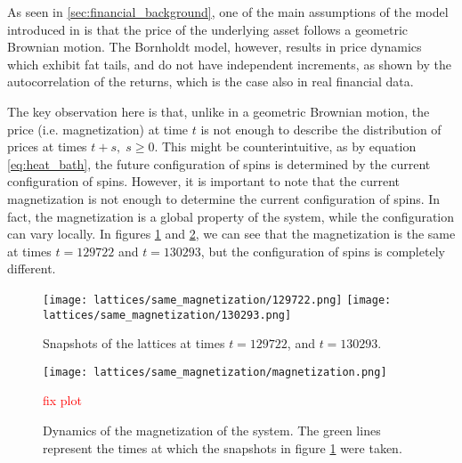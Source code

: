 As seen in \ref{sec:financial_background}, one of the main assumptions of the model introduced in \cite{black_scholes} is that the price of the underlying asset follows a geometric Brownian motion. The Bornholdt model, however, results in price dynamics which exhibit fat tails, and do not have independent increments, as shown by the autocorrelation of the returns, which is the case also in real financial data.

The key observation here is that, unlike in a geometric Brownian motion, the price (i.e. magnetization) at time $t$ is not enough to describe the distribution of prices at times $t+s, \; s\geq 0$. This might be counterintuitive, as by equation \ref{eq:heat_bath}, the future configuration of spins is determined by the current configuration of spins. However, it is important to note that the current magnetization is not enough to determine the current configuration of spins. In fact, the magnetization is a global property of the system, while the configuration can vary locally. In figures \ref{fig:lattices_m100} and \ref{fig:magnetization_m100}, we can see that the magnetization is the same at times $t=129722$ and $t=130293$, but the configuration of spins is completely different.

\begin{figure}[H]
    \centering
    \texttt{[image: lattices/same\_magnetization/129722.png]}
    \texttt{[image: lattices/same\_magnetization/130293.png]}
    \caption{Snapshots of the lattices at times $t=129722$, and $t=130293$.}
    \label{fig:lattices_m100}
\end{figure}

\begin{figure}[H]
    \centering
    \texttt{[image: lattices/same\_magnetization/magnetization.png]}
    \caption{Dynamics of the magnetization of the system. The green lines represent the times at which the snapshots in figure \ref{fig:lattices_m100} were taken.} \textcolor{red}{fix plot}
    \label{fig:magnetization_m100}
\end{figure}